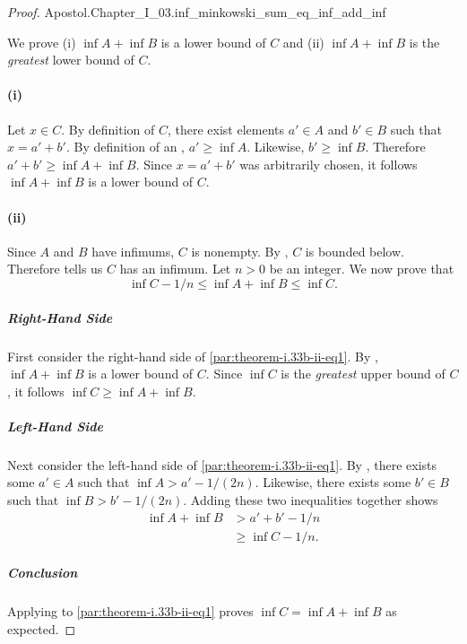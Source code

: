 \documentclass{report}
\begin{document}
\begin{proof}

    {Apostol.Chapter\_I\_03.inf\_minkowski\_sum\_eq\_inf\_add\_inf}

  We prove (i) $\inf{A} + \inf{B}$ is a lower bound of $C$ and (ii)
    $\inf{A} + \inf{B}$ is the \textit{greatest} lower bound of $C$.

  \paragraph{(i)}%
  \label{par:theorem-i.33b-i}

    Let $x \in C$.
    By definition of $C$, there exist elements $a' \in A$ and $b' \in B$ such
      that $x = a' + b'$.
    By definition of an , $a' \geq \inf{A}$.
    Likewise, $b' \geq \inf{B}$.
    Therefore $a' + b' \geq \inf{A} + \inf{B}$.
    Since $x = a' + b'$ was arbitrarily chosen, it follows $\inf{A} + \inf{B}$
      is a lower bound of $C$.

  \paragraph{(ii)}%

    Since $A$ and $B$ have infimums, $C$ is nonempty.
    By , $C$ is bounded below.
    Therefore  tells us $C$ has an infimum.
    Let $n > 0$ be an integer.
    We now prove that
      \begin{equation}
        \label{par:theorem-i.33b-ii-eq1}
        \inf{C} - 1 / n \leq \inf{A} + \inf{B} \leq \inf{C}.
      \end{equation}

    \subparagraph{Right-Hand Side}%

      First consider the right-hand side of \eqref{par:theorem-i.33b-ii-eq1}.
      By , $\inf{A} + \inf{B}$ is a lower bound of
        $C$.
      Since $\inf{C}$ is the \textit{greatest} upper bound of $C$, it follows
        $\inf{C} \geq \inf{A} + \inf{B}$.

    \subparagraph{Left-Hand Side}%

      Next consider the left-hand side of \eqref{par:theorem-i.33b-ii-eq1}.
      By , there exists some $a' \in A$ such that
        $\inf{A} > a' - 1 / (2n)$.
      Likewise, there exists some $b' \in B$ such that
        $\inf{B} > b' - 1 / (2n)$.
      Adding these two inequalities together shows
        \begin{align*}
          \inf{A} + \inf{B}
            & > a' + b' - 1 / n \\
            & \geq \inf{C} - 1 / n.
        \end{align*}

    \subparagraph{Conclusion}%

      Applying  to \eqref{par:theorem-i.33b-ii-eq1}
        proves $\inf{C} = \inf{A} + \inf{B}$ as expected.

\end{proof}
\end{document}
